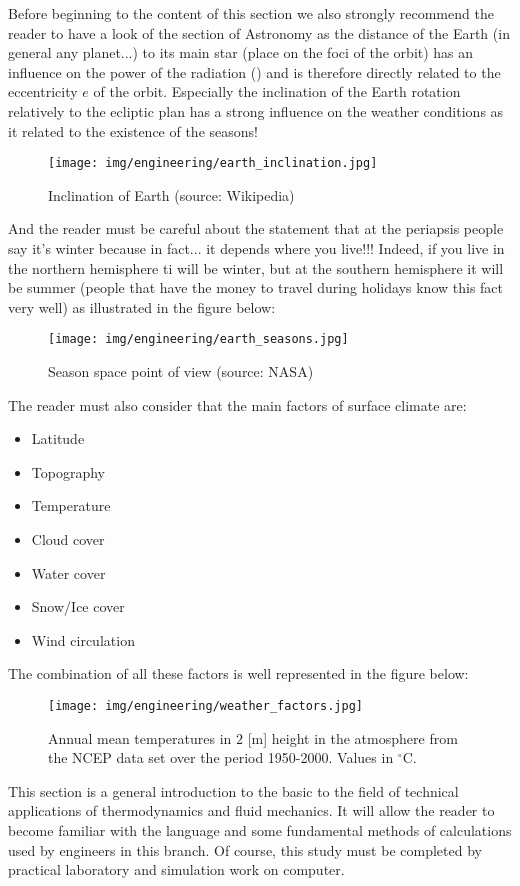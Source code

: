 	Before beginning to the content of this section we also strongly recommend the reader to have a look of the section of Astronomy as the distance of the Earth (in general any planet...) to its main star (place on the foci of the orbit) has an influence on the power of the radiation () and is therefore directly related to the eccentricity $e$ of the orbit. Especially the inclination of the Earth rotation relatively to the ecliptic plan has a strong influence on the weather conditions as it related to the existence of the seasons!
	\begin{figure}[H]
		\centering
		\texttt{[image: img/engineering/earth\_inclination.jpg]}
		\caption{Inclination of Earth (source: Wikipedia)}
	\end{figure}
	And the reader must be careful about the statement that at the periapsis people say it's winter because in fact... it depends where you live!!! Indeed, if you live in the northern hemisphere ti will be winter, but at the southern hemisphere it will be summer (people that have the money to travel during holidays know this fact very well) as illustrated in the figure below:
	\begin{figure}[H]
		\centering
		\texttt{[image: img/engineering/earth\_seasons.jpg]}
		\caption{Season space point of view (source: NASA)}
	\end{figure}
	The reader must also consider that the main factors of surface climate are:
	\begin{itemize}
		\item Latitude
		\item Topography
		\item Temperature
		\item Cloud cover
		\item Water cover
		\item Snow/Ice cover
		\item Wind circulation
	\end{itemize}
	The combination of all these factors is well represented in the figure below:
	\begin{figure}[H]
		\centering
		\texttt{[image: img/engineering/weather\_factors.jpg]}
		\caption{Annual mean temperatures in $2$ [m] height in the atmosphere from the NCEP data set over the period 1950-2000. Values in $^\circ$C.}
	\end{figure}
	This section is a general introduction to the basic to the field of technical applications of thermodynamics and fluid mechanics. It will allow the reader to become familiar with the language and some fundamental methods of calculations used by engineers in this branch. Of course, this study must be completed by practical laboratory and simulation work on computer.
	
